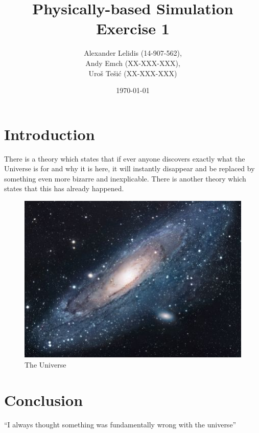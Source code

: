\documentclass{article}
\title{Physically-based Simulation \\ Exercise 1}
\author{ 
    Alexander Lelidis (14-907-562), \\
    Andy Emch (XX-XXX-XXX), \\
    Uro\v{s} Te\v{s}i\'{c} (XX-XXX-XXX)
}
\date{\today}
\begin{document}
\maketitle

\section{Introduction}
There is a theory which states that if ever anyone discovers exactly what the Universe is for and why it is here, it will instantly disappear and be replaced by something even more bizarre and inexplicable.
There is another theory which states that this has already happened.

\begin{figure}[h!]
\centering
\includegraphics[scale=1.7]{universe.jpg}
\caption{The Universe}
\label{fig:univerise}
\end{figure}

\section{Conclusion}
``I always thought something was fundamentally wrong with the universe'' \citep{adams1995hitchhiker}



\end{document}
